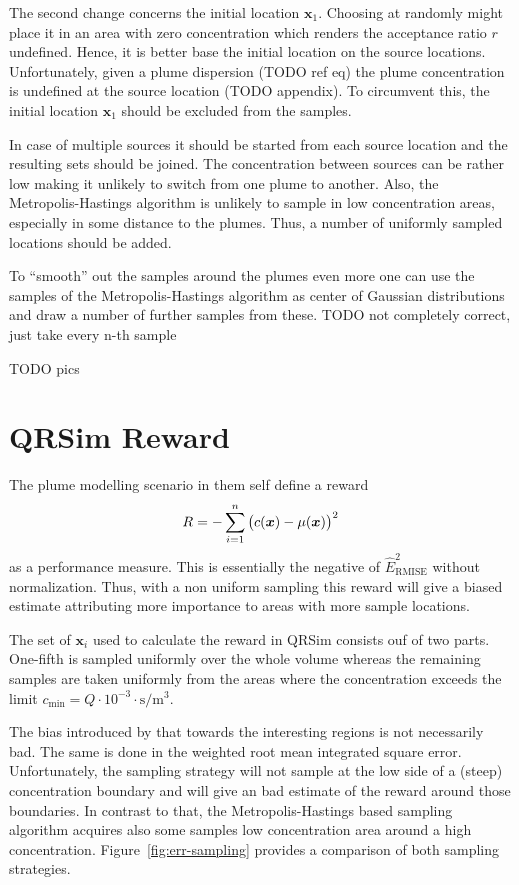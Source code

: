 \documentclass[11pt,a4paper,twoside,BCOR=15mm]{scrreprt}
\newcommand{\vc}[1]{\bm{#1}}
\newcommand{\ped}[1]{_{\mathrm{#1}}}
\begin{document}
The second change concerns the initial location $\vc x_1$. Choosing at randomly 
might place it in an area with zero concentration which renders the acceptance 
ratio $r$ undefined. Hence, it is better base the initial location on the source 
locations. Unfortunately, given a plume dispersion (TODO ref eq) the plume 
concentration is undefined at the source location (TODO appendix). To circumvent 
this, the initial location $\vc x_1$ should be excluded from the samples.

In case of multiple sources it should be started from each source location and 
the resulting sets should be joined. The concentration between sources can be 
rather low making it unlikely to switch from one plume to another. Also, the 
Metropolis-Hastings algorithm is unlikely to sample in low concentration areas, 
especially in some distance to the plumes. Thus, a number of uniformly sampled 
locations should be added.

To ``smooth'' out the samples around the plumes even more one can use the 
samples of the Metropolis-Hastings algorithm as center of Gaussian distributions 
and draw a number of further samples from these.
TODO not completely correct, just take every n-th sample

TODO pics

\section{QRSim Reward}
The plume modelling scenario in \textcite{denardi2013rn} them self define 
a reward
\begin{equation}
    R = - \sum_{i = 1}^n \del{c(\vc x) - \mu(\vc x)}^2
\end{equation}
as a performance measure. This is essentially the negative of 
$\hat{E}\ped{RMISE}^2$ without normalization. Thus, with a non uniform sampling 
this reward will give a biased estimate attributing more importance to areas 
with more sample locations.

The set of $\vc x_i$ used to calculate the reward in QRSim consists ouf of two 
parts. One-fifth is sampled uniformly over the whole volume whereas the 
remaining samples are taken uniformly from the areas where the concentration 
exceeds the limit $c_{\min} = Q \cdot 10^{-3} \cdot 
\si{\second\per\meter\cubed}$.

The bias introduced by that towards the interesting regions is not necessarily 
bad. The same is done in the weighted root mean integrated square error.  
Unfortunately, the sampling strategy will not sample at the low side of 
a (steep) concentration boundary and will give an bad estimate of the reward 
around those boundaries. In contrast to that, the Metropolis-Hastings based 
sampling algorithm acquires also some samples low concentration area around 
a high concentration. Figure~\ref{fig:err-sampling} provides a comparison of 
both sampling strategies.
\end{document}
